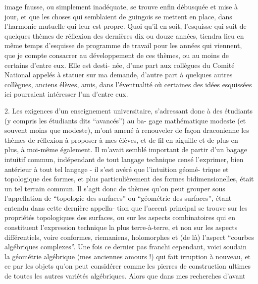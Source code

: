 
image fausse, ou simplement inadéquate, se trouve enfin débusquée
et mise à jour, et que les choses qui semblaient de guingois se
mettent en place, dans l'harmonie mutuelle qui leur est propre.
\qquad Quoi qu'il en soit, l'esquisse qui suit de quelques
thèmes de réflexion des dernières dix ou douze années, tiendra
lieu en même temps d'esquisse de programme de travail pour les
années qui viennent, que je compte consacrer au développement de
ces thèmes, ou au moins de certains d'entre eux. Elle est desti-%
née, d'une part aux collègues du Comité National appelés à statuer
sur ma demande, d'autre part à quelques autres collègues, anciens
élèves, amis, dans l'éventualité où certaines des idées esquissées
ici pourraient intéresser l'un d'entre eux.

2. \qquad Les exigences d'un enseignement universitaire, s'adressant
donc à des étudiants (y compris les étudiants dits ``avancés'') au ba-%
gage mathématique modeste (et souvent moins que modeste), m'ont amené
à renouveler de façon draconienne les thèmes de réflexion à proposer
à mes élèves, et de fil en aiguille et de plus en plus, à moi-même
également. Il m'avait semblé important de partir d'un bagage intuitif
commun, indépendant de tout langage technique censé l'exprimer, bien
antérieur à tout tel langage - il s'est avéré que l'intuition géomé-%
trique et topologique des formes, et plus particulièrement des formes
bidimensionelles, était un tel terrain commun. Il s'agit donc de thèmes
qu'on peut grouper sous l'appellation de ``topologie des surfaces'' ou
``géométrie des surfaces'', étant entendu dans cette dernière appella-%
tion que l'accent principal se trouve sur les propriétés topologiques
des surfaces, ou sur les aspects combinatoires qui en constituent
l'expression technique la plus terre-à-terre, et non sur les aspects
différentiels, voire conformes, riemaniens, holomorphes et (de là)
l'aspect ``courbes algébriques complexes''. Une fois ce dernier pas
franchi cependant, voici soudain la géométrie algébrique (mes anciennes
amours !) qui fait irruption à nouveau, et ce par les objets qu'on
peut considérer comme les pierres de construction ultimes de toutes
les autres variétés algébriques. Alors que dans mes recherches d'avant


